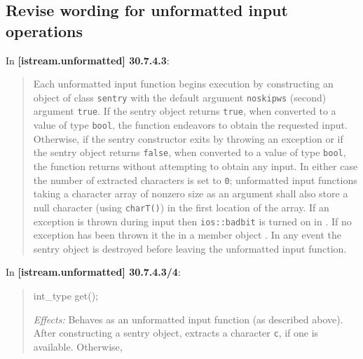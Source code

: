 \documentclass{wg21}
\begin{document}
\subsection{Revise wording for unformatted input operations}
In \textbf{[istream.unformatted] 30.7.4.3}:
\begin{quote}
Each unformatted input function begins execution by constructing  an object of
class \texttt{sentry} with the default argument \texttt{noskipws} (second)
argument \texttt{true}. If the sentry object returns \texttt{true}, when
converted to a value of type \texttt{bool}, the function endeavors to obtain
the requested input. Otherwise, if the sentry constructor exits by throwing an
exception or if the sentry object returns \texttt{false}, when converted to a
value of type \texttt{bool}, the function returns without attempting to obtain
any input. In either case the number of extracted characters is set to \texttt{0};
unformatted input functions taking a character array of nonzero size as an
argument shall also store a null character (using \texttt{charT()}) in the
first location of the array.  If an exception is
thrown during input then \texttt{ios::badbit} is turned on in .  If no exception has been thrown it
 the  in a member object .
 In any event the sentry object is destroyed before leaving
the unformatted input function.
\end{quote}

In \textbf{[istream.unformatted] 30.7.4.3/4}:
\begin{quote}
\begin{codeblock}
int_type get();
\end{codeblock}
\textit{Effects:} Behaves as an unformatted input function (as described above).
After constructing a sentry object, extracts a character \texttt{c}, if one is
available. Otherwise, 
\end{quote}
\end{document}

